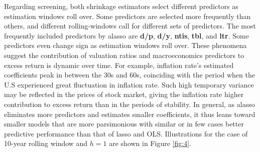 \documentclass[12pt,a4paper]{article}
\begin{document}
Regarding screening, both shrinkage estimators select different predictors as estimation windows roll over. Some predictors are selected more frequently than others, and different rolling-windows call for different sets of predictors. The most frequently included predictors by alasso are \textbf{d/p}, \textbf{d/y}, \textbf{ntis}, \textbf{tbl}, and \textbf{ltr}. Some predictors even change sign as estimation windows roll over. These phenomena suggest the contribution of valuation ratios and macroeconomics predictors to excess return is dynamic over time. For example, inflation rate's estimated coefficients peak in between the 30s and 60s, coinciding with the period when the U.S experienced great fluctuation in inflation rate. Such high temporary variance may be reflected in the prices of stock market, giving the inflation rate higher contribution to excess return than in the periods of stability. In general, as alasso eliminates more predictors and estimates smaller coefficients, it thus leans toward smaller models that are more parsimonious \citep{lee2018lasso} with similar or in few cases better predictive performance than that of lasso and OLS. Illustrations for the case of 10-year rolling window and $ h = 1 $ are shown in Figure \ref{fig:4}.
\end{document}
